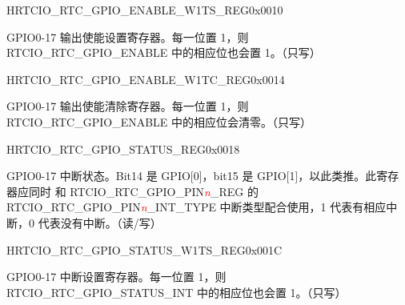 \begin{register}{H}{RTCIO\_RTC\_GPIO\_ENABLE\_W1TS\_REG}{0x0010}\label{regdesc:RTCIORTCGPIOENABLEW1TSREG}
%
%
\regnewline%
\begin{regdesc}\begin{reglist}
\item [RTCIO\_RTC\_GPIO\_ENABLE\_W1TS]GPIO0-17 输出使能设置寄存器。每一位置 1，则 RTCIO\_RTC\_GPIO\_ENABLE 中的相应位也会置 1。（只写）
\end{reglist}\end{regdesc}
\end{register}


\begin{register}{H}{RTCIO\_RTC\_GPIO\_ENABLE\_W1TC\_REG}{0x0014}\label{regdesc:RTCIORTCGPIOENABLEW1TCREG}
%
%
\regnewline%
\begin{regdesc}\begin{reglist}
\item [RTCIO\_RTC\_GPIO\_ENABLE\_W1TC]GPIO0-17 输出使能清除寄存器。每一位置 1，则 RTCIO\_RTC\_GPIO\_ENABLE 中的相应位会清零。（只写）
\end{reglist}\end{regdesc}
\end{register}


\begin{register}{H}{RTCIO\_RTC\_GPIO\_STATUS\_REG}{0x0018}\label{regdesc:RTCIORTCGPIOSTATUSREG}
%
%
\regnewline%
\begin{regdesc}\begin{reglist}
\item [RTCIO\_RTC\_GPIO\_STATUS\_INT]GPIO0-17 中断状态。Bit14 是 GPIO[0]，bit15 是 GPIO[1]，以此类推。此寄存器应同时                                  和 RTCIO\_RTC\_GPIO\_PIN\textcolor{red}{\it{n}}\_REG 的 RTCIO\_RTC\_GPIO\_PIN\textcolor{red}{\it{n}}\_INT\_TYPE 中断类型配合使用，1 代表有相应中断，0 代表没有中断。（读/写）
\end{reglist}\end{regdesc}
\end{register}


\begin{register}{H}{RTCIO\_RTC\_GPIO\_STATUS\_W1TS\_REG}{0x001C}\label{regdesc:RTCIORTCGPIOSTATUSW1TSREG}
%
%
\regnewline%
\begin{regdesc}\begin{reglist}
\item [RTCIO\_RTC\_GPIO\_STATUS\_INT\_W1TS]GPIO0-17 中断设置寄存器。每一位置 1，则 RTCIO\_RTC\_GPIO\_STATUS\_INT 中的相应位也会置 1。（只写）
\end{reglist}\end{regdesc}
\end{register}


